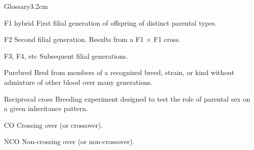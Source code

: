 
\begin{mclistof}{Glossary}{3.2cm}
\item[F1 hybrid] First filial generation of offspring of distinct parental types.
\item[F2] Second filial generation. Results from a F1 $\times$ F1 cross.
\item[F3, F4, etc] Subsequent filial generations.
\item[Purebred] Bred from members of a recognized breed, strain, or kind without admixture of other blood over many generations.
\item[Reciprocal cross] Breeding experiment designed to test the role of parental sex on a given inheritance pattern.
\item[CO] Crossing over (or crossover).
\item[NCO] Non-crossing over (or non-crossover).

\end{mclistof}

